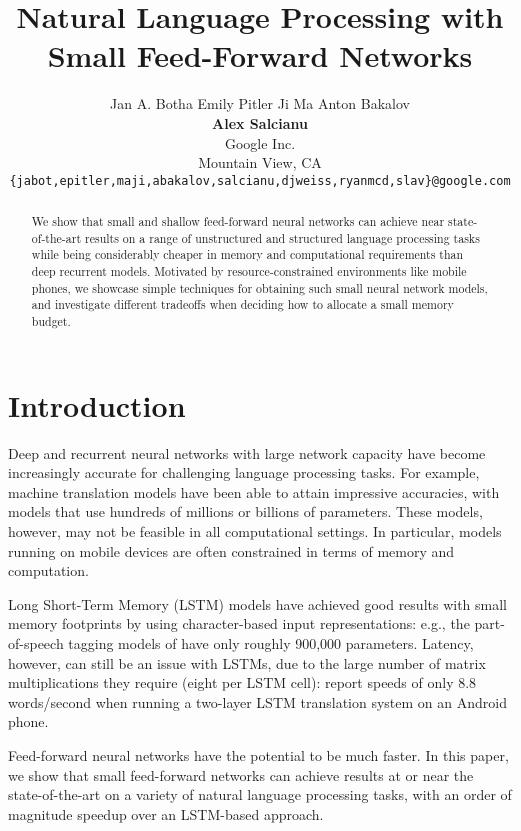 \documentclass[11pt,letterpaper]{article}
\title{Natural Language Processing with Small Feed-Forward Networks}
\author{%
  Jan A. Botha \quad Emily Pitler \quad Ji Ma \quad Anton Bakalov \\[0.8ex]
  {\bf Alex Salcianu} \quad {\bf David Weiss} \quad {\bf Ryan McDonald} \quad {\bf Slav Petrov} \\[0.5ex]
  Google Inc. \\
  Mountain View, CA \\
  {\small \tt \{jabot,epitler,maji,abakalov,salcianu,djweiss,ryanmcd,slav\}@google.com}}
\date{}
\begin{document}
\maketitle

\begin{abstract}
We show that small and shallow feed-forward neural networks can achieve near state-of-the-art results on a range of unstructured and structured language processing tasks while being considerably cheaper in memory and computational requirements than deep recurrent models.
  Motivated by resource-constrained environments like mobile phones, we showcase simple techniques for obtaining such small neural network models, and investigate different tradeoffs when deciding how to allocate a small memory budget.
  \end{abstract}

\section{Introduction}
Deep and recurrent neural networks with large network capacity
have become increasingly accurate for challenging language processing tasks.
For example, machine translation models have been able to attain impressive
accuracies, with models that use hundreds of millions \cite{bahdanau2014neural,googlenmt} or billions \cite{shazeer2017outrageously} of parameters.
These models, however, may not be feasible in all computational settings.
In particular, models running on mobile devices are often constrained
in terms of memory and computation.

Long Short-Term Memory (LSTM) models \cite{hochreiter1997} 
have achieved good results with small memory footprints 
by using character-based input representations:
e.g., the part-of-speech tagging models of 
have only roughly 900,000 parameters.
Latency, however, can still be an issue with LSTMs, due to the large number of 
matrix multiplications they require (eight per LSTM cell):
 report speeds of only 8.8 words/second when running a two-layer LSTM translation system on an Android phone.

Feed-forward neural networks have the potential to be much faster.
In this paper, we show that small feed-forward networks 
can achieve results at or near the state-of-the-art
on a variety of natural language processing tasks,
with an order of magnitude speedup over an LSTM-based approach.
\end{document}
